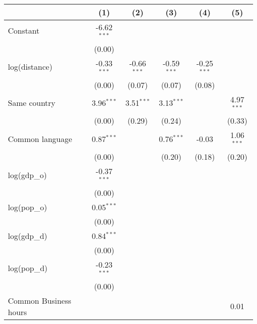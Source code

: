 
\begingroup
\centering
\small
\begin{tabular}{lccccc}
   \toprule
                            & (1)           & (2)           & (3)           & (4)           & (5)\\  
   \midrule 
   Constant                 & -6.62$^{***}$ &               &               &               &   \\   
                            & (0.00)        &               &               &               &   \\   
   log(distance)            & -0.33$^{***}$ & -0.66$^{***}$ & -0.59$^{***}$ & -0.25$^{***}$ &   \\   
                            & (0.00)        & (0.07)        & (0.07)        & (0.08)        &   \\   
   Same country             & 3.96$^{***}$  & 3.51$^{***}$  & 3.13$^{***}$  &               & 4.97$^{***}$\\   
                            & (0.00)        & (0.29)        & (0.24)        &               & (0.33)\\   
   Common language          & 0.87$^{***}$  &               & 0.76$^{***}$  & -0.03         & 1.06$^{***}$\\   
                            & (0.00)        &               & (0.20)        & (0.18)        & (0.20)\\   
   log(gdp\_o)              & -0.37$^{***}$ &               &               &               &   \\   
                            & (0.00)        &               &               &               &   \\   
   log(pop\_o)              & 0.05$^{***}$  &               &               &               &   \\   
                            & (0.00)        &               &               &               &   \\   
   log(gdp\_d)              & 0.84$^{***}$  &               &               &               &   \\   
                            & (0.00)        &               &               &               &   \\   
   log(pop\_d)              & -0.23$^{***}$ &               &               &               &   \\   
                            & (0.00)        &               &               &               &   \\   
   Common Business hours    &               &               &               &               & 0.01\\   

\end{tabular}
